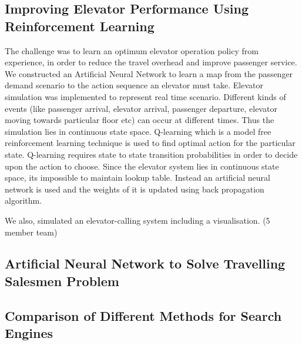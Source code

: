\documentclass[11pt,a4paper]{moderncv}
\begin{document}
\subsection{Improving Elevator Performance Using Reinforcement Learning}
 {The challenge was to learn an optimum elevator operation policy from experience, in order to reduce the travel overhead and improve passenger service. We constructed an Artificial Neural Network to learn a map from the passenger demand scenario to the action sequence an elevator must take. 
Elevator simulation was implemented to represent real time scenario. Different kinds of events (like passenger arrival, elevator arrival, passenger departure, elevator moving towards particular floor etc) can occur at different times. Thus the simulation lies in continuous state space. Q-learning which is a model free reinforcement learning technique is used to find optimal action for the particular state. Q-learning requires state to state transition probabilities in order to decide upon the action to choose. Since the elevator system lies in continuous state space, its impossible to maintain lookup table. Instead an artificial neural network is used and the weights of it is updated using back propagation algorithm.
 
We also, simulated an elevator-calling system including a visualisation. (5 member team)}

\subsection{Artificial Neural Network to Solve Travelling Salesmen Problem}

\subsection{Comparison of Different Methods for Search Engines}
\end{document}
